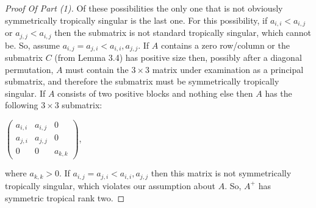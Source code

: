 \documentclass{article}
\begin{document}
\begin{proof}[Proof Of Part (1)]
  Of these possibilities the only one that is not obviously symmetrically tropically singular is the last one. For this possibility, if $a_{i,i} < a_{i,j}$ or $a_{j,j} < a_{i,j}$ then the submatrix is not standard tropically singular, which cannot be. So, assume $a_{i,j} = a_{j,i} < a_{i,i},a_{j,j}$. If $A$ contains a zero row/column or the submatrix $C$ (from Lemma 3.4) has positive size then, possibly after a diagonal permutation, $A$ must contain the $3 \times 3$ matrix under examination as a principal submatrix, and therefore the submatrix must be symmetrically tropically singular. If $A$ consists of two positive blocks and nothing else then $A$ has the following $3 \times 3$ submatrix:
  \begin{center}
    $\left(\begin{array}{ccc} a_{i,i} & a_{i,j} & 0 \\ a_{j,i} & a_{j,j} & 0 \\ 0 & 0 & a_{k,k} \end{array}\right)$,
  \end{center}
  where $a_{k,k} > 0$. If $a_{i,j} = a_{j,i} < a_{i,i}, a_{j,j}$ then this matrix is not symmetrically tropically singular, which violates our assumption about $A$. So, $A^{+}$ has symmetric tropical rank two.
\end{proof}
\end{document}
